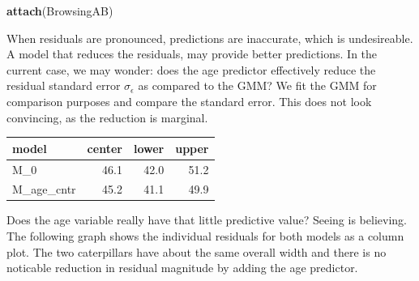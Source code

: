\documentclass[]{svmono}
\newenvironment{Shaded}{\begin{snugshade}}{\end{snugshade}}
\newcommand{\KeywordTok}[1]{\textcolor[rgb]{0.13,0.29,0.53}{\textbf{#1}}}
\newcommand{\DataTypeTok}[1]{\textcolor[rgb]{0.13,0.29,0.53}{#1}}
\newcommand{\DecValTok}[1]{\textcolor[rgb]{0.00,0.00,0.81}{#1}}
\newcommand{\StringTok}[1]{\textcolor[rgb]{0.31,0.60,0.02}{#1}}
\newcommand{\OperatorTok}[1]{\textcolor[rgb]{0.81,0.36,0.00}{\textbf{#1}}}
\newcommand{\NormalTok}[1]{#1}
\theoremstyle{definition}
\theoremstyle{definition}
\theoremstyle{definition}
\theoremstyle{remark}
\begin{document}
\begin{Shaded}
\begin{Highlighting}[]
\KeywordTok{attach}\NormalTok{(BrowsingAB)}
\end{Highlighting}
\end{Shaded}

When residuals are pronounced, predictions are inaccurate, which is
undesireable. A model that reduces the residuals, may provide better
predictions. In the current case, we may wonder: does the age predictor
effectively reduce the residual standard error \(\sigma_\epsilon\) as
compared to the GMM? We fit the GMM for comparison purposes and compare
the standard error. This does not look convincing, as the reduction is
marginal.

\begin{Shaded}
\end{Shaded}

\begin{Shaded}
\end{Shaded}

\begin{longtable}[]{@{}lrrr@{}}
\toprule
model & center & lower & upper\tabularnewline
\midrule
\endhead
M\_0 & 46.1 & 42.0 & 51.2\tabularnewline
M\_age\_cntr & 45.2 & 41.1 & 49.9\tabularnewline
\bottomrule
\end{longtable}

Does the age variable really have that little predictive value? Seeing
is believing. The following graph shows the individual residuals for
both models as a column plot. The two caterpillars have about the same
overall width and there is no noticable reduction in residual magnitude
by adding the age predictor.
\end{document}
